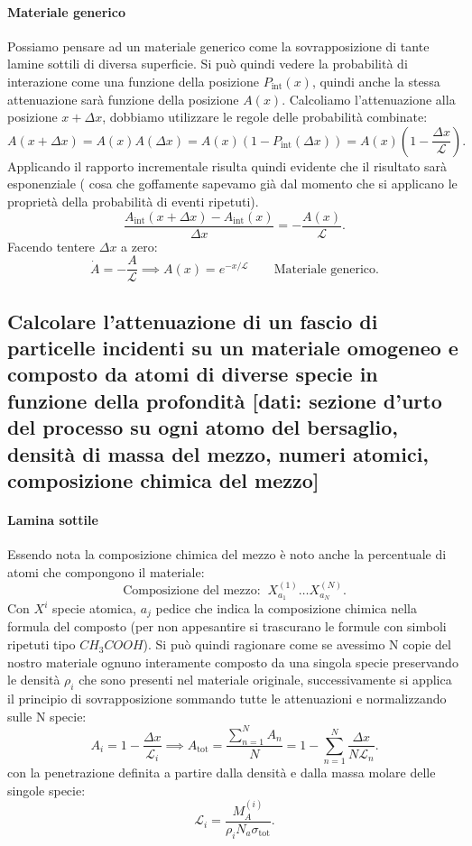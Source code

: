 \paragraph{Materiale generico} Possiamo pensare ad un materiale generico come la sovrapposizione di tante lamine sottili di diversa superficie. Si può quindi vedere la probabilità di interazione come una funzione della posizione $P_{\text{int}}\left( x \right)$, quindi anche la stessa attenuazione sarà funzione della posizione $A\left( x \right) $. Calcoliamo l'attenuazione alla posizione $x + \Delta x$, dobbiamo utilizzare le regole delle probabilità combinate:
\[
	A\left( x + \Delta x \right) = A\left( x \right) A\left( \Delta x \right) = A\left( x \right) \left( 1- P_{\text{int}}\left( \Delta x \right)  \right) = A\left( x \right) \left( 1 - \frac{\Delta x }{\mathcal{L}} \right)  
.\]
Applicando il rapporto incrementale risulta quindi evidente che il risultato sarà esponenziale ( cosa che goffamente sapevamo già dal momento che si applicano le proprietà della probabilità di eventi ripetuti).
\[
	\frac{A_{\text{int}}\left( x + \Delta x \right) - A_{\text{int}}\left( x \right)}{\Delta x} = -\frac{A\left( x \right) }{\mathcal{L}} 
.\]
Facendo tentere $\Delta x$ a zero:
\[
	\dot{A} = -\frac{A}{\mathcal{L}} \implies A\left( x \right) = e^{-x/\mathcal{L}} \quad \quad 
	\text{Materiale generico}
.\] 

\subsection[]{  Calcolare l'attenuazione di un fascio di particelle incidenti su un materiale omogeneo e composto da atomi di diverse specie in funzione della profondità [dati: sezione d'urto del processo su ogni atomo del bersaglio, densità di massa del mezzo, numeri atomici, composizione chimica del mezzo]}
\paragraph{Lamina sottile}
Essendo nota la composizione chimica del mezzo è noto anche la percentuale di atomi che compongono il materiale:
\[
	\text{Composizione del mezzo: } \ X^{\left( 1 \right) }_{a_1}\ldots X^{(N)}_{a_N}
.\]
Con $X^{i}$ specie atomica, $a_j$ pedice che indica la composizione chimica nella formula del composto (per non appesantire si trascurano le formule con simboli ripetuti tipo $CH_3COOH$).
Si può quindi ragionare come se avessimo N copie del nostro materiale ognuno interamente composto da una singola specie preservando le densità $\rho_i$ che sono presenti nel materiale originale, successivamente si applica il principio di sovrapposizione sommando tutte le attenuazioni e normalizzando sulle N specie:
\[
	A_i = 1 - \frac{\Delta x}{\mathcal{L}_i} \implies A_{\text{tot}} = \frac{\sum_{n=1}^{N} A_n}{N} = 1 - \sum_{n=1}^{N} \frac{\Delta x}{N \mathcal{L}_n}
.\] 
con la penetrazione definita a partire dalla densità e dalla massa molare delle singole specie:
\[
	\mathcal{L}_i = \frac{M_{A}^{\left( i \right) }}{\rho_i N_a \sigma_{\text{tot}}}
.\]
